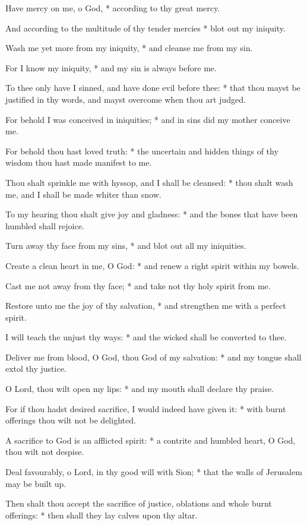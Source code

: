 \begin{enpars}
\item Have mercy on me, o God, * according to thy great mercy.
\item And according to the multitude of thy tender mercies * blot out my iniquity.
\item Wash me yet more from my iniquity, * and cleanse me from my sin.
\item For I know my iniquity, * and my sin is always before me.
\item To thee only have I sinned, and have done evil before thee: * that thou mayst be justified in thy words, and mayst overcome when thou art judged.
\item For behold I was conceived in iniquities; * and in sins did my mother conceive me.
\item For behold thou hast loved truth: * the uncertain and hidden things of thy wisdom thou hast made manifest to me.
\item Thou shalt sprinkle me with hyssop, and I shall be cleansed: * thou shalt wash me, and I shall be made whiter than snow.
\item To my hearing thou shalt give joy and gladness: * and the bones that have been humbled shall rejoice.
\item Turn away thy face from my sins, * and blot out all my iniquities.
\item Create a clean heart in me, O God: * and renew a right spirit within my bowels.
\item Cast me not away from thy face; * and take not thy holy spirit from me.
\item Restore unto me the joy of thy salvation, * and strengthen me with a perfect spirit.
\item I will teach the unjust thy ways: * and the wicked shall be converted to thee.
\item Deliver me from blood, O God, thou God of my salvation: * and my tongue shall extol thy justice.
\item O Lord, thou wilt open my lips: * and my mouth shall declare thy praise.
\item For if thou hadst desired sacrifice, I would indeed have given it: * with burnt offerings thou wilt not be delighted.
\item A sacrifice to God is an afflicted spirit: * a contrite and humbled heart, O God, thou wilt not despise.
\item Deal favourably, o Lord, in thy good will with Sion; * that the walls of Jerusalem may be built up.
\item Then shalt thou accept the sacrifice of justice, oblations and whole burnt offerings: * then shall they lay calves upon thy altar.
\end{enpars}